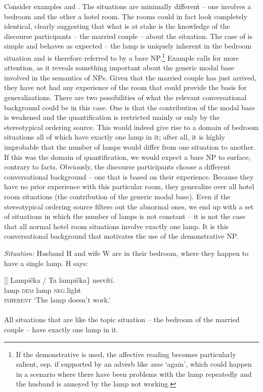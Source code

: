 \documentclass[output=paper,colorlinks,citecolor=brown,newtxmath]{langscibook}
\begin{document}
Consider examples  and . The situations are minimally different -- one involves a bedroom and the other a hotel room. The rooms could in fact look completely identical, clearly suggesting that what is at stake is the knowledge of the discourse participants -- the married couple -- about the situation. The case of  is simple and behaves as expected -- the lamp is uniquely inherent in the bedroom situation and is therefore referred to by a bare NP.\footnote{If the demonstrative is used, the affective reading becomes particularly salient, esp. if supported by an adverb like \textit{zase} `again', which could happen in a scenario where there have been problems with the lamp repeatedly and the husband is annoyed by the lamp not working.} Example  calls for more attention, as it reveals something important about the generic modal base involved in the semantics of NPs. Given that the married couple has just arrived, they have not had any experience of the room that could provide the basis for generalizations. There are two possibilities of what the relevant conversational background could be in this case. One is that the contribution of the modal base is weakened and the quantification is restricted mainly or only by the stereotypical ordering source. This would indeed give rise to a domain of bedroom situations all of which have exactly one lamp in it; after all, it is highly improbable that the number of lamps would differ from one situation to another. If this was the domain of quantification, we would expect a bare NP to surface, contrary to facts. Obviously, the discourse participants choose a different conversational background -- one that is based on their experience. Because they have no prior experience with this particular room, they generalize over all hotel room situations (the contribution of the generic modal base). Even if the stereotypical ordering source filters out the abnormal ones, we end up with a set of situations in which the number of lamps is not constant -- it is not the case that all normal hotel room situations involve exactly one lamp. It is this conversational background that motivates the use of the demonstrative NP.

\ea \textit{Situation:} Husband H and wife W are in their bedroom, where they happen to have a single lamp. H says:\label{simik:ex:lamp1}
\begin{xlist}
[]{\gll \minsp{\{} Lampička / \minsp{\#} Ta lampička\} nesvítí.\\
{} lamp {} {} \textsc{dem} lamp \textsc{neg.}light\\\hfill\textsc{inherent}
\glt `The lamp doesn't work.'\\\smallskip
{}\smallskip\\
All situations that are like the topic situation -- the bedroom of the married couple -- have exactly one lamp in it.}
\end{xlist}
\z
\end{document}
